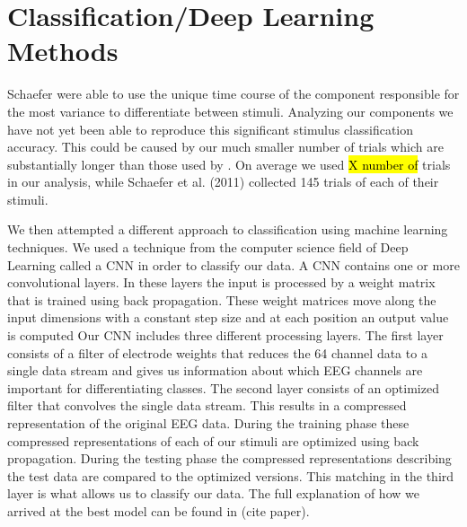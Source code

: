 \chapter*{Classification/Deep Learning Methods}
Schaefer \etal \cite{schaefer_name_2011} were able to use the unique time course of the component responsible for the most variance to differentiate between stimuli.
Analyzing our components we have not yet been able to reproduce this significant stimulus classification accuracy. 
This could be caused by our much smaller number of trials which are substantially longer than those used by \cite{schaefer_name_2011}. 
On average we used \hl{X number of} trials in our analysis, while Schaefer et al. (2011) collected 145 trials of each of their stimuli.

We then attempted a different approach to classification using machine learning techniques. 
We used a technique from the computer science field of Deep Learning called a \ac{CNN} in order to classify our data.
A \ac{CNN} contains one or more convolutional layers.
In these layers the input is processed by a weight matrix that is trained using back propagation. 
These weight matrices move along the input dimensions with a constant step size and at each position an output value is computed 
Our \ac{CNN} includes three different processing layers. 
The first layer consists of a filter of electrode weights that reduces the 64 channel data to a single data stream and gives us information about which EEG channels are important for differentiating classes.
The second layer consists of an optimized filter that convolves the single data stream.
This results in a compressed representation of the original EEG data.
During the training phase these compressed representations of each of our stimuli are optimized using back propagation.
During the testing phase the compressed representations describing the test data are compared to the optimized versions. 
This matching in the third layer is what allows us to classify our data.
The full explanation of how we arrived at the best model can be found in (cite paper).

